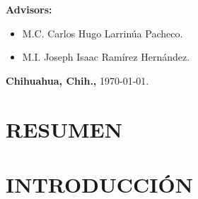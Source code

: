 \documentclass[12pt]{report}
\begin{document}
\begin{titlepage}
\begin{center}
			{\large \textbf{Advisors:}}\\[3.5ex]
			\begin{itemize}
				\item[\ding{226}] {\large M.C. Carlos Hugo Larrinúa Pacheco.}\\[3.5ex]
				\item[\ding{226}] {\large M.I. Joseph Isaac Ramírez Hernández.}\\[3.5ex]
			\end{itemize}
			\vfill
			{\large \textbf{Chihuahua, Chih.,} \today.}\\[3.5ex]
		\end{center}
	\end{titlepage}

\tableofcontents
\thispagestyle{empty} %


\pagebreak
\chapter*{RESUMEN}

\pagebreak
\chapter{INTRODUCCIÓN}
\vspace{-3em}
\end{document}
